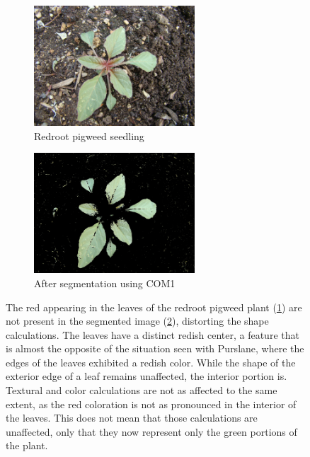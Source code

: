 \documentclass[letterpaper, notitlepage]{report}
\begin{document}
\begin{figure}[h!]
	\centering
	\begin{subfigure}[h]{.40\textwidth}
		\centering
		\includegraphics[width=6cm]{./figures/redroot-pigweed.jpg}
		\caption{Redroot pigweed seedling}
		\label{subfig:redroot-before}
	\end{subfigure}
	\begin{subfigure}[h]{.40\textwidth}
		\centering
		\includegraphics[width=6cm]{./figures/redroot-pigweed-COM1.jpg}
		\caption{After segmentation using COM1}
		\label{subfig:redroot-after}
	\end{subfigure}
	\caption[Red coloration within the leaves of redroot pigweed]{The red appearing in the leaves of the redroot pigweed plant (\ref{subfig:redroot-before}) are not present in the segmented image (\ref{subfig:redroot-after}), distorting the shape calculations. The leaves have a distinct redish center, a feature that is almost the opposite of the situation seen with Purslane, where the edges of the leaves exhibited a redish color. While the shape of the exterior edge of a leaf remains unaffected, the interior portion is. Textural and color calculations are not as affected to the same extent, as the red coloration is not as pronounced in the interior of the leaves. This does not mean that those calculations are unaffected, only that they now represent only the green portions of the plant.}
	\label{fig:redroot}
\end{figure}
\end{document}
